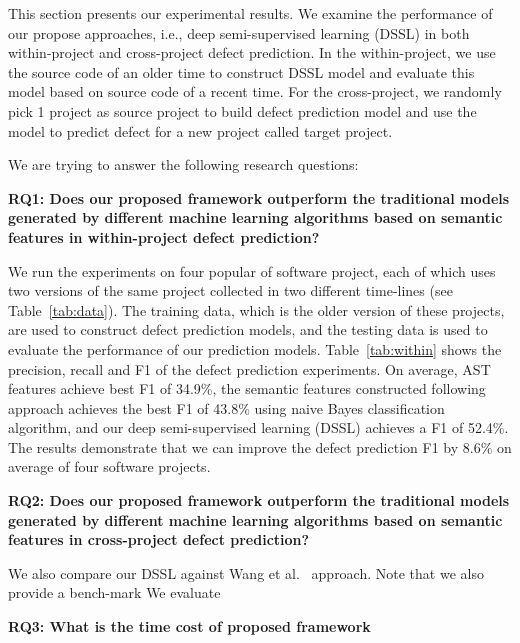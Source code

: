 

This section presents our experimental results. We examine the performance of our propose approaches, i.e., deep semi-supervised learning (DSSL) in both within-project and cross-project defect prediction. In the within-project, we use the source code of an older time to construct DSSL model and evaluate this model based on source code of a recent time. For the cross-project, we randomly pick 1 project as source project to build defect prediction model and use the model to predict defect for a new project called target project.

We are trying to answer the following research questions: 

\textbf{RQ1: Does our proposed framework outperform the traditional models generated by different machine learning algorithms based on semantic features in within-project defect prediction?}

We run the experiments on four popular of software project, each of which uses two versions of the same project collected in two different time-lines (see Table~\ref{tab:data}). The training data, which is the older version of these projects, are used to construct defect prediction models, and the testing data is used to evaluate the performance of our prediction models. Table~\ref{tab:within} shows the precision, recall and F1 of the defect prediction experiments. On average, AST features achieve best F1 of 34.9\%, the semantic features constructed following~\cite{wang2016automatically} approach achieves the best F1 of 43.8\% using naive Bayes classification algorithm, and our deep semi-supervised learning (DSSL) achieves a F1 of 52.4\%. The results demonstrate that we can improve the defect prediction F1 by 8.6\% on average of four software projects. 


\textbf{RQ2: Does our proposed framework outperform the traditional models generated by different machine learning algorithms based on semantic features in cross-project defect prediction?}

We also compare our DSSL against Wang et al.~\cite{wang2016automatically} approach. Note that we also provide a bench-mark We evaluate 

\textbf{RQ3: What is the time cost of proposed framework}


